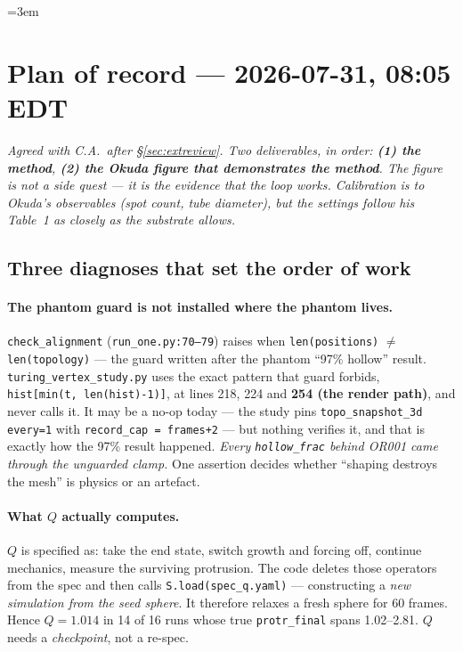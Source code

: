 \documentclass[11pt]{article}
\newcommand{\code}[1]{\texttt{#1}}
\begin{document}
\clearpage
{\sloppy\emergencystretch=3em
\section{Plan of record --- 2026-07-31, 08:05 EDT}
\label{sec:plan}

\emph{Agreed with C.A.\ after \S\ref{sec:extreview}. Two deliverables, in order: \textbf{(1) the
method}, \textbf{(2) the Okuda figure that demonstrates the method}. The figure is not a side
quest --- it is the evidence that the loop works. Calibration is to Okuda's \emph{observables}
(spot count, tube diameter), but the \emph{settings} follow his Table~1 as closely as the substrate
allows.}

\subsection{Three diagnoses that set the order of work}

\paragraph{The phantom guard is not installed where the phantom lives.}
\code{check\_alignment} (\code{run\_one.py:70--79}) raises when
\code{len(positions)} $\neq$ \code{len(topology)} --- the guard written after the phantom
``97\% hollow'' result. \code{turing\_vertex\_study.py} uses the exact pattern that guard forbids,
\code{hist[min(t,\,len(hist)-1)]}, at lines 218, 224 and \textbf{254 (the render path)}, and
never calls it. It may be a no-op today --- the study pins \code{topo\_snapshot\_3d every=1} with
\code{record\_cap = frames+2} --- but nothing verifies it, and that is exactly how the 97\% result
happened. \emph{Every \code{hollow\_frac} behind OR001 came through the unguarded clamp.} One
assertion decides whether ``shaping destroys the mesh'' is physics or an artefact.

\paragraph{What $Q$ actually computes.} $Q$ is specified as: take the end state, switch growth and
forcing off, continue mechanics, measure the surviving protrusion. The code deletes those operators
from the spec and then calls \code{S.load(spec\_q.yaml)} --- constructing a \emph{new simulation
from the seed sphere}. It therefore relaxes a fresh sphere for 60 frames. Hence $Q = 1.014$ in 14
of 16 runs whose true \code{protr\_final} spans 1.02--2.81. $Q$ needs a \emph{checkpoint}, not a
re-spec.

}
\end{document}
